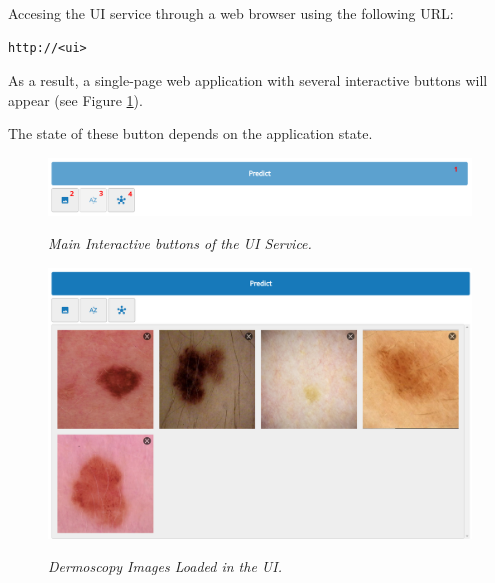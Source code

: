 \documentclass[dvipsnames,mathserif]{beamer}
\begin{document}
{\begin{frame}[fragile]
      \footnotesize
      Accesing the UI service through a web browser using the following URL:

      \vspace{0.1cm}

      \begin{Verbatim}[fontsize=\tiny]
http://<ui>
      \end{Verbatim}

      As a result, a single-page web application with several interactive buttons will appear (see Figure \ref{fig:ui-tools}).

      \vspace{0.2cm}
      The state of these button depends on the application state.


      \begin{figure}[H]
        \centering
        \includegraphics[width=\textwidth]{images/ui-tools.png}
        \caption[Main Interactive buttons of the UI Service]{\textit{Main Interactive buttons of the UI Service.}}
        {\label{fig:ui-tools}}
      \end{figure}

    \end{frame}


    \begin{frame}

      \begin{figure}[H]
        \centering
        \begin{adjustbox}{width=0.55\textwidth, trim={0cm 2.8cm 0cm 0cm}, clip}
          \includegraphics[width=\textwidth]{images/loaded-images.png}
        \end{adjustbox}
        \caption[Dermoscopy Images Loaded in the UI]{\footnotesize{\textit{Dermoscopy Images
        Loaded in the UI.}}}
        {\label{fig:loaded-images}}


\end{figure}
\end{frame}}
\end{document}
